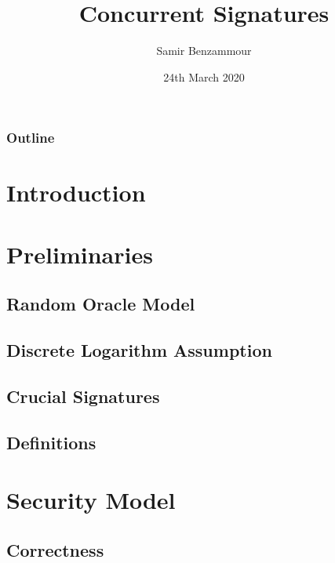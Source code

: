 \documentclass{beamer}
\title{Concurrent Signatures}
\author{Samir Benzammour}
\date{24th March 2020}
\institute[RWTH]{
  Algorithms and Computational Complexity\\
  RWTH Aachen University
}
\begin{document}
\frame{\titlepage}

\begin{frame}
	\frametitle{Outline}
	\tableofcontents
\end{frame}

\section{Introduction}


\section{Preliminaries}


\subsection{Random Oracle Model}
% 

\subsection{Discrete Logarithm Assumption}
% 

\subsection{Crucial Signatures}
% 

\subsection{Definitions}
% 



\section{Security Model}


\subsection{Correctness}
% 
\end{document}
